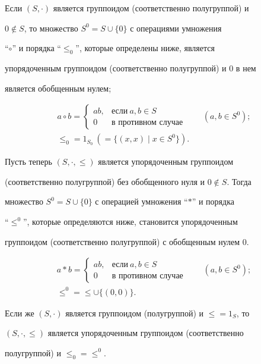 \begin{note} 


Если $(S,\cdot)$ является группоидом (соответственно полугруппой) и 


$0\notin S$, то множество $S^0=S\cup\{0\}$ с операциями умножения 


``$\circ$'' и порядка ``$\le_0$'', которые определены ниже, является 


упорядоченным группоидом (соответственно полугруппой) и 0 в нем 


является обобщенным нулем;


\begin{gather*} 


a\circ b=\begin{cases} 


ab, & \text{если} \ a,b\in S\\ 


0 & \text{в противном случае} 


\end{cases} 


\qquad (a,b\in S^0);\\ 


\le_0=1_{S_0} \ (=\{(x,x)\mid x\in S^0\}). 


\end{gather*} 


Пусть теперь $(S,\cdot,\le)$ является упорядоченным группоидом 


(соответственно полугруппой) без обобщенного нуля и $0\notin S$. Тогда 


множество $S^0=S\cup\{0\}$ с операцией умножения ``$*$'' и порядка 


``$\le^0$'', которые определяются ниже, становится упорядоченным 


группоидом (соответственно полугруппой) с обобщенным нулем 0. 


\begin{gather*} 


a*b=\begin{cases} 


ab, & \text{если} \ a,b\in S \\ 


0 & \text{в противном случае} 


\end{cases} 


\qquad (a,b\in S^0); \\ 


\le^0=\le\cup\{(0,0)\}. 


\end{gather*} 


Если же $(S,\cdot)$ является группоидом (полугруппой) и $\le=1_S$, то 


$(S,\cdot,\le)$ является упорядоченным группоидом (соответственно 


полугруппой) и $\le_0=\le^0$. 


\end{note} 


